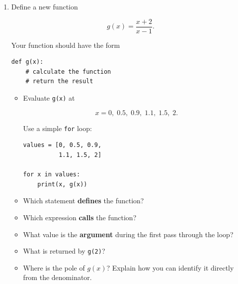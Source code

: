 \documentclass{article}
\begin{document}
\begin{enumerate}

\item Define a new function

\[
g(x)=\frac{x+2}{x-1}.
\]

Your function should have the form

\begin{verbatim}
def g(x):
    # calculate the function
    # return the result
\end{verbatim}

\begin{itemize}

\item Evaluate \texttt{g(x)} at

\[
x=0,\;0.5,\;0.9,\;1.1,\;1.5,\;2.
\]

Use a simple \texttt{for} loop:

\begin{verbatim}
values = [0, 0.5, 0.9,
          1.1, 1.5, 2]

for x in values:
    print(x, g(x))
\end{verbatim}

\item Which statement \textbf{defines} the function?

\item Which expression \textbf{calls} the function?

\item What value is the \textbf{argument} during the first
pass through the loop?

\item What is returned by \texttt{g(2)}?

\item Where is the pole of $g(x)$?  Explain how you can
identify it directly from the denominator.

\end{itemize}

\end{enumerate}
\end{document}
